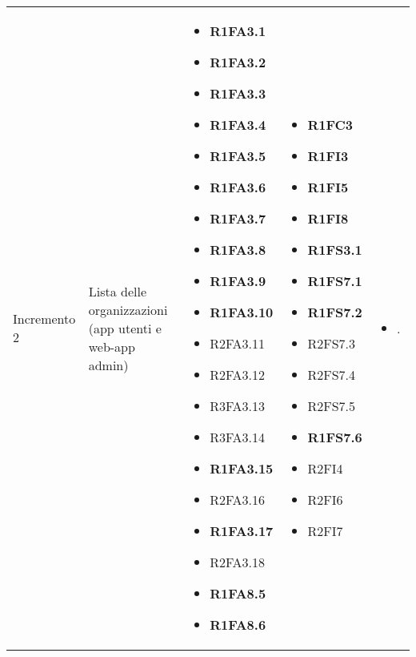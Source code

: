 {\begin{longtable}{C{2.5cm} C{3.2cm} C{2.8cm} C{2.8cm} C{2.8cm}}
Incremento 2 & Lista delle organizzazioni (app utenti e web-app admin) & \begin{itemize}
    \item[ ] \textbf{R1FA3.1}
    \item[ ] \textbf{R1FA3.2}
    \item[ ] \textbf{R1FA3.3}
    \item[ ] \textbf{R1FA3.4}
    \item[ ] \textbf{R1FA3.5}
    \item[ ] \textbf{R1FA3.6}
    \item[ ] \textbf{R1FA3.7}
    \item[ ] \textbf{R1FA3.8}
    \item[ ] \textbf{R1FA3.9}
    \item[ ] \textbf{R1FA3.10}
    \item[ ] R2FA3.11
    \item[ ] R2FA3.12
    \item[ ] R3FA3.13
    \item[ ] R3FA3.14
    \item[ ] \textbf{R1FA3.15}
    \item[ ] R2FA3.16
    \item[ ] \textbf{R1FA3.17}
    \item[ ] R2FA3.18 
    \item[ ] \textbf{R1FA8.5}
    \item[ ] \textbf{R1FA8.6}
\end{itemize} & \begin{itemize} 
    \item[ ] \textbf{R1FC3}
    \item[ ] \textbf{R1FI3}
    \item[ ] \textbf{R1FI5}
    \item[ ] \textbf{R1FI8}
    \item[ ] \textbf{R1FS3.1}
    \item[ ] \textbf{R1FS7.1}
    \item[ ] \textbf{R1FS7.2}
    \item[ ] R2FS7.3
    \item[ ] R2FS7.4
    \item[ ] R2FS7.5 
    \item[ ] \textbf{R1FS7.6}
    \item[ ] R2FI4
    \item[ ] R2FI6
    \item[ ] R2FI7
\end{itemize} & \begin{itemize} 
    \item[ ] .
\end{itemize}\\


\end{longtable}}
